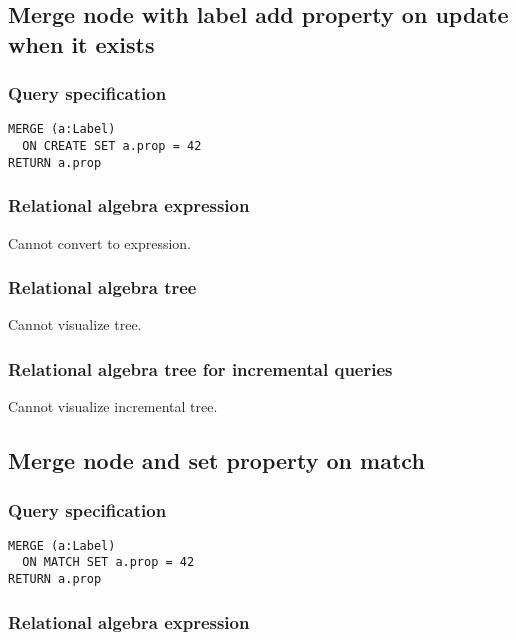 \subsection{Merge node with label add property on update when it exists}

\subsubsection*{Query specification}

\begin{lstlisting}
MERGE (a:Label)
  ON CREATE SET a.prop = 42
RETURN a.prop
\end{lstlisting}

\subsubsection*{Relational algebra expression}

Cannot convert to expression.

\subsubsection*{Relational algebra tree}

Cannot visualize tree.

\subsubsection*{Relational algebra tree for incremental queries}

Cannot visualize incremental tree.

\subsection{Merge node and set property on match}

\subsubsection*{Query specification}

\begin{lstlisting}
MERGE (a:Label)
  ON MATCH SET a.prop = 42
RETURN a.prop
\end{lstlisting}

\subsubsection*{Relational algebra expression}

